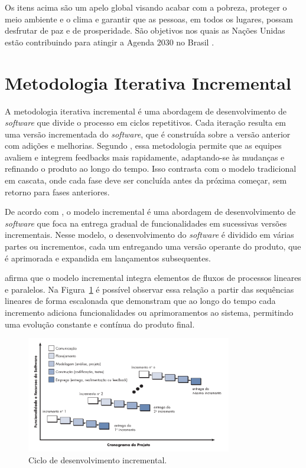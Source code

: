 Os itens acima são um apelo global visando acabar com a pobreza, proteger o meio ambiente e o clima e garantir que as pessoas, em todos os lugares, possam desfrutar de paz e de prosperidade. São objetivos nos quais as Nações Unidas estão contribuindo para atingir a Agenda 2030 no Brasil \cite{onu2015ods}.

\section{Metodologia Iterativa Incremental}
A metodologia iterativa incremental é uma abordagem de desenvolvimento de \textit{software} que divide o processo em ciclos repetitivos. Cada iteração resulta em uma versão incrementada do \textit{software}, que é construída sobre a versão anterior com adições e melhorias. Segundo , essa metodologia permite que as equipes avaliem e integrem feedbacks mais rapidamente, adaptando-se às mudanças e refinando o produto ao longo do tempo. Isso contrasta com o modelo tradicional em cascata, onde cada fase deve ser concluída antes da próxima começar, sem retorno para fases anteriores.

De acordo com , o modelo incremental é uma abordagem de desenvolvimento de \textit{software} que foca na entrega gradual de funcionalidades em sucessivas versões incrementais. Nesse modelo, o desenvolvimento do \textit{software} é dividido em várias partes ou incrementos, cada um entregando uma versão operante do produto, que é aprimorada e expandida em lançamentos subsequentes.

 afirma que o modelo incremental integra elementos de fluxos de processos lineares e paralelos. Na Figura~\ref{fig:incremental} é possível observar essa relação a partir das sequências lineares de forma escalonada que demonstram que ao longo do tempo cada incremento adiciona funcionalidades ou aprimoramentos ao sistema, permitindo uma evolução constante e contínua do produto final.

\begin{figure}[htb]
  \centering
  \includegraphics[width=0.8\textwidth]{imagens/graficoPressman.png}
  \caption{Ciclo de desenvolvimento incremental.}
  \label{fig:incremental}
\end{figure}

